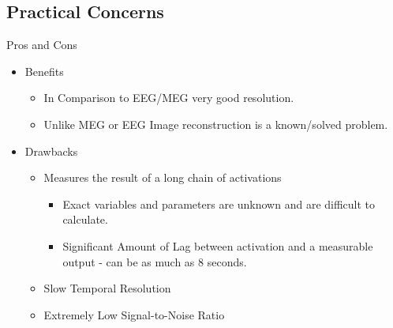 \documentclass{beamer}
\begin{document}
\subsection{Practical Concerns}
\begin{frame}{Pros and Cons}
  \begin{itemize}
    \item Benefits
    \begin{itemize}
        \item In Comparison to EEG/MEG very good resolution.
        \item Unlike MEG or EEG Image reconstruction is a known/solved problem.
    \end{itemize}
    \item Drawbacks
    \begin{itemize}
      \item Measures the result of a long chain of activations
      \begin{itemize}
        \item Exact variables and parameters are unknown and are
            difficult to calculate.
        \item Significant Amount of Lag between activation
            and a measurable output - can be as much as 8 seconds.
      \end{itemize}
      \item Slow Temporal Resolution
      \item Extremely Low Signal-to-Noise Ratio 
    \end{itemize}
  \end{itemize}
\end{frame}
\end{document}
